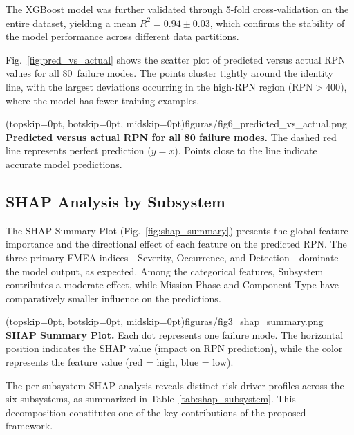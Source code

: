 The XGBoost model was further validated through 5-fold cross-validation on the entire dataset, yielding a mean $R^2 = 0.94 \pm 0.03$, which confirms the stability of the model performance across different data partitions.

Fig.~\ref{fig:pred_vs_actual} shows the scatter plot of predicted versus actual RPN values for all 80~failure modes. The points cluster tightly around the identity line, with the largest deviations occurring in the high-RPN region ($\text{RPN} > 400$), where the model has fewer training examples.

\Figure[t!](topskip=0pt, botskip=0pt, midskip=0pt){figuras/fig6_predicted_vs_actual.png}
{\textbf{Predicted versus actual RPN for all 80 failure modes.} The dashed red line represents perfect prediction ($y = x$). Points close to the line indicate accurate model predictions.\label{fig:pred_vs_actual}}

\subsection{SHAP Analysis by Subsystem}
\label{subsec:shap_results}

The SHAP Summary Plot (Fig.~\ref{fig:shap_summary}) presents the global feature importance and the directional effect of each feature on the predicted RPN. The three primary FMEA indices---Severity, Occurrence, and Detection---dominate the model output, as expected. Among the categorical features, Subsystem contributes a moderate effect, while Mission Phase and Component Type have comparatively smaller influence on the predictions.

\Figure[t!](topskip=0pt, botskip=0pt, midskip=0pt){figuras/fig3_shap_summary.png}
{\textbf{SHAP Summary Plot.} Each dot represents one failure mode. The horizontal position indicates the SHAP value (impact on RPN prediction), while the color represents the feature value (red = high, blue = low).\label{fig:shap_summary}}

The per-subsystem SHAP analysis reveals distinct risk driver profiles across the six subsystems, as summarized in Table~\ref{tab:shap_subsystem}. This decomposition constitutes one of the key contributions of the proposed framework.

